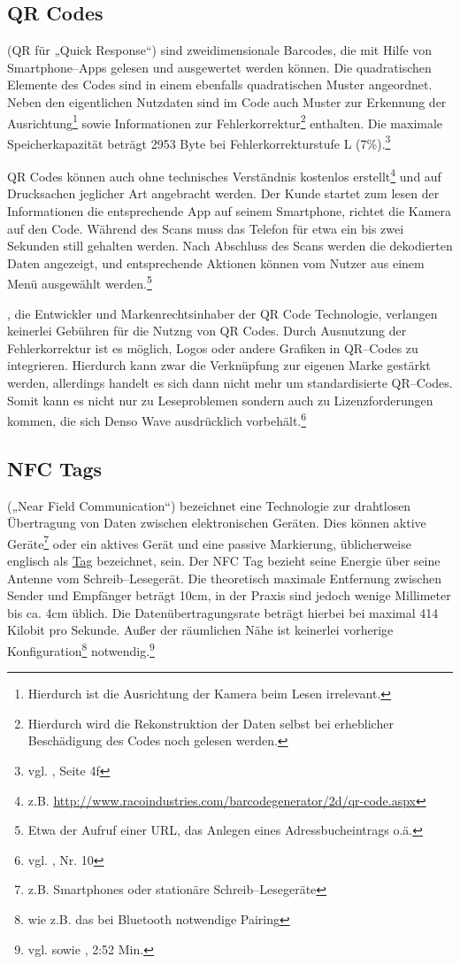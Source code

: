 \subsection{QR Codes} %
\label{sub:qr_codes}
 (QR für „Quick Response“) sind zweidimensionale Barcodes, die mit Hilfe von Smartphone–Apps gelesen und ausgewertet werden können. Die quadratischen Elemente des Codes sind in einem ebenfalls quadratischen Muster angeordnet. Neben den eigentlichen Nutzdaten sind im Code auch Muster zur Erkennung der Ausrichtung\footnote{Hierdurch ist die Ausrichtung der Kamera beim Lesen irrelevant.} sowie Informationen zur Fehlerkorrektur\footnote{Hierdurch wird die Rekonstruktion der Daten selbst bei erheblicher Beschädigung des Codes noch gelesen werden.} enthalten. Die maximale Speicherkapazität beträgt 2953 Byte bei Fehlerkorrekturstufe L (7\%).\footnote{vgl. \cite{iso18004}, Seite 4f}

QR Codes können auch ohne technisches Verständnis kostenlos erstellt\footnote{z.B. \url{http://www.racoindustries.com/barcodegenerator/2d/qr-code.aspx}} und auf Drucksachen jeglicher Art angebracht werden. Der Kunde startet zum lesen der Informationen die entsprechende App auf seinem Smartphone, richtet die Kamera auf den Code. Während des Scans muss das Telefon für etwa ein bis zwei Sekunden still gehalten werden. Nach Abschluss des Scans werden die dekodierten Daten angezeigt, und entsprechende Aktionen können vom Nutzer aus einem Menü ausgewählt werden.\footnote{Etwa der Aufruf einer URL, das Anlegen eines Adressbucheintrags o.ä.} 

, die Entwickler und Markenrechtsinhaber der QR Code Technologie,  verlangen keinerlei Gebühren für die Nutzng von QR Codes. Durch Ausnutzung der Fehlerkorrektur ist es möglich, Logos oder andere Grafiken in QR–Codes zu integrieren. Hierdurch kann zwar die Verknüpfung zur eigenen Marke gestärkt werden, allerdings handelt es sich dann nicht mehr um standardisierte QR–Codes. Somit kann es nicht nur zu Leseproblemen sondern auch zu Lizenzforderungen kommen, die sich Denso Wave ausdrücklich vorbehält.\footnote{vgl. \cite{denso-faq}, Nr. 10}

\subsection{NFC Tags} %
\label{sub:nfc_tags}
 („Near Field Communication“) bezeichnet eine Technologie zur drahtlosen Übertragung von Daten zwischen elektronischen Geräten. Dies können aktive Geräte\footnote{z.B. Smartphones oder stationäre Schreib–Lesegeräte} oder ein aktives Gerät und eine passive Markierung, üblicherweise englisch als \url{Tag} bezeichnet, sein. Der NFC Tag bezieht seine Energie über seine Antenne vom Schreib–Lesegerät. Die theoretisch maximale Entfernung zwischen Sender und Empfänger beträgt 10cm, in der Praxis sind jedoch wenige Millimeter bis ca. 4cm üblich. Die Datenübertragungsrate beträgt hierbei bei maximal 414 Kilobit pro Sekunde. Außer der räumlichen Nähe ist keinerlei vorherige Konfiguration\footnote{wie z.B. das bei Bluetooth notwendige Pairing} notwendig.\footnote{vgl. \cite{nfcforum:about} sowie \cite{google:nfc}, 2:52 Min.}

